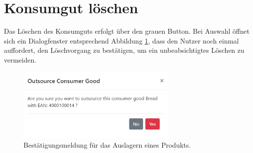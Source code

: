 \section{Konsumgut löschen}
\label{konsumgut-loeschen}
Das Löschen des Konsumguts erfolgt über den grauen Button.
Bei Auswahl öffnet sich ein Dialogfenster entsprechend Abbildung \ref{fig:gui-delete-item}, dass den Nutzer noch einmal auffordert, den Löschvorgang zu bestätigen, um ein unbeabsichtigtes Löschen zu vermeiden.

\begin{figure}[H]
	\centering
	\includegraphics[width=0.7\textwidth]{Bilder/gui/new/gui-outsource-consumer-goods.PNG}
	\caption[Auslagern eines Konsumguts.]{Bestätigungsmeldung für das Auslagern eines Produkts.}
	\label{fig:gui-delete-item}
\end{figure}
